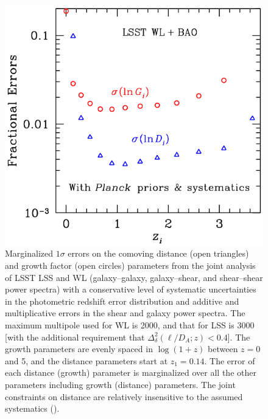 


\begin{figure}
\includegraphics[width=1.0\hsize,clip]{dges.pdf}
\caption{Marginalized $1\sigma$ errors on the comoving distance
(open triangles) and growth factor (open circles) parameters from
the joint analysis of LSST LSS and WL (galaxy--galaxy, galaxy--shear,
and shear--shear power spectra) with a
conservative level of systematic uncertainties in the photometric redshift error
distribution and additive and multiplicative errors in the shear and
galaxy power spectra. The maximum multipole used for WL is
2000, and that for LSS is 3000 [with the additional requirement that
$\Delta_\delta^2(\ell/D_{A};z) < 0.4$].
The growth parameters
are evenly spaced in
$\log(1+z)$ between $z = 0$ and 5, and the distance parameters
start at $z_1 = 0.14$.
The error of each distance (growth) parameter is marginalized
over all the other parameters including growth (distance) parameters. The joint constraints on
distance are relatively insensitive to the assumed systematics
(\cite{2009ApJ...690..923Z}).}
\label{Fig:bao2}
\end{figure}


